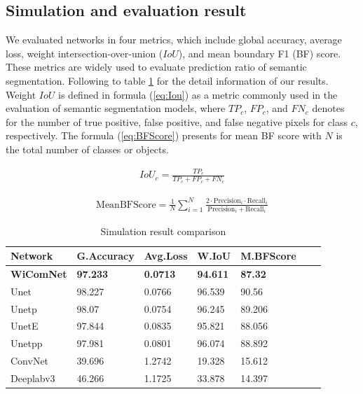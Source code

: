\documentclass[journal]{IEEEtran} %
\begin{document}
\subsection{Simulation and evaluation result}

We evaluated networks in four metrics, which include global accuracy, average loss, weight intersection-over-union (\(IoU\)), and mean boundary F1 (BF) score. These metrics are widely used to evaluate prediction ratio of semantic segmentation. Following to table \ref{tab3} for the detail information of our results. Weight \(IoU\) is defined in formula (\ref{eq:Iou}) as a metric commonly used in the evaluation of semantic segmentation models, where \(TP_c\), \(FP_c\), and \(FN_c\) denotes for  the number of true positive, false positive, and false negative pixels for class \(c\),  respectively. The formula (\ref{eq:BFScore}) presents for mean BF score with \(N\) is the total number of classes or objects.


\begin{equation}
\begin{aligned}
    IoU_c = \frac{TP_c}{TP_c + FP_c + FN_c}
    \label{eq:Iou}
\end{aligned}
\end{equation}

\begin{equation}
\begin{aligned}
    \text{MeanBFScore} = \frac{1}{N} \sum_{i=1}^{N} \frac{2 \cdot \text{Precision}_i \cdot \text{Recall}_i}{\text{Precision}_i + \text{Recall}_i}
    \label{eq:BFScore}
\end{aligned}
\end{equation}


\begin{table}[!htbp]
\centering
\caption{Simulation result comparison}
\label{tab3}
\begin{tabular}{|l|l|l|l|l|l|l|}
\toprule
\hline
\textbf{Network}  & \textbf{G.Accuracy} &  \textbf{Avg.Loss} & \textbf{W.IoU} & \textbf{M.BFScore} \\
\hline
\textbf{WiComNet}  & \textbf{97.233} & \textbf{0.0713} & \textbf{94.611} & \textbf{87.32}  \\
Unet   & 98.227 & 0.0766  &  96.539 & 90.56\\
Unetp   & 98.07 & 0.0754  &   96.245 & 89.206\\
UnetE   & 97.844 & 0.0835  & 95.821  & 88.056 \\
Unetpp   & 97.981 & 0.0801  & 96.074 & 88.892 \\
ConvNet   & 39.696 & 1.2742 & 19.328 & 15.612 \\
Deeplabv3   & 46.266 & 1.1725  &  33.878 & 14.397 \\
\hline
\end{tabular}
\end{table}
\end{document}
